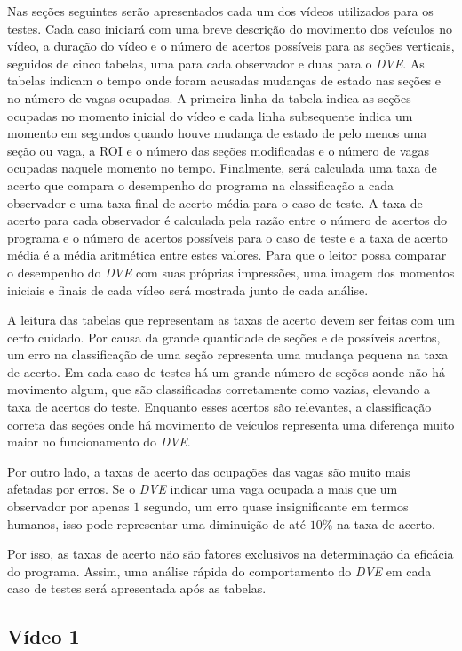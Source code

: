 Nas seções seguintes serão apresentados cada um dos vídeos utilizados para os testes. Cada caso iniciará com uma breve descrição do movimento dos veículos no vídeo, a duração do vídeo e o número de acertos possíveis para as seções verticais, seguidos de cinco tabelas, uma para cada observador e duas para o \textit{DVE}. As tabelas indicam o tempo onde foram acusadas mudanças de estado nas seções e no número de vagas ocupadas. A primeira linha da tabela indica as seções ocupadas no momento inicial do vídeo e cada linha subsequente indica um momento em segundos quando houve mudança de estado de pelo menos uma seção ou vaga, a ROI e o número das seções modificadas e o número de vagas ocupadas naquele momento no tempo.  Finalmente, será calculada uma taxa de acerto que compara o desempenho do programa na classificação a cada observador e uma taxa final de acerto média para o caso de teste. A taxa de acerto para cada observador é calculada pela razão entre o número de acertos do programa e o número de acertos possíveis para o caso de teste e a taxa de acerto média é a média aritmética entre estes valores. Para que o leitor possa comparar o desempenho do \textit{DVE} com suas próprias impressões, uma imagem dos momentos iniciais e finais de cada vídeo será mostrada junto de cada análise.

A leitura das tabelas que representam as taxas de acerto devem ser feitas com um certo cuidado. Por causa da grande quantidade de seções e de possíveis acertos, um erro na classificação de uma seção representa uma mudança pequena na taxa de acerto. Em cada caso de testes há um grande número de seções aonde não há movimento algum, que são classificadas corretamente como vazias, elevando a taxa de acertos do teste. Enquanto esses acertos são relevantes, a classificação correta das seções onde há movimento de veículos representa uma diferença muito maior no funcionamento do \textit{DVE}.

Por outro lado, a taxas de acerto das ocupações das vagas são muito mais afetadas por erros. Se o \textit{DVE} indicar uma vaga ocupada a mais que um observador por apenas $1$ segundo, um erro quase insignificante em termos humanos, isso pode representar uma diminuição de até $10\%$ na taxa de acerto. 

Por isso, as taxas de acerto não são fatores exclusivos na determinação da eficácia do programa. Assim, uma análise rápida do comportamento do \textit{DVE} em cada caso de testes será apresentada após as tabelas.

\subsection{Vídeo 1}

